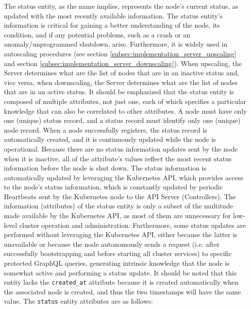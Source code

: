 The status entity, as the name implies, represents the node's current status, as
updated with the most recently available information.
\newline
The status entity's information is critical for gaining a better understanding
of the node, its condition, and if any potential problems, such as a crash or an
anomaly/unprogrammed shutdown, arise. Furthermore, it is widely used in
autoscaling procedures (see section \ref{subsec:implementation_server_upscaling}
and section \ref{subsec:implementation_server_downscaling}). When upscaling, the
Server determines what are the list of nodes that are in an inactive status and,
vice versa, when downscaling, the Server determines what are the list of nodes that
are in an active status. It should be emphasized that the status entity is
composed of multiple attributes, not just one, each of which specifies a
particular knowledge that can also be correlated to other attributes.
\newline
A node must have only one (unique) status record, and a status record must
identify only one (unique) node record. When a node successfully registers, the
status record is automatically created, and it is continuously updated while the
node is operational. Because there are no status information updates sent by the
node when it is inactive, all of the attribute's values reflect the most recent status
information before the node is shut down.
\newline
The status information is automatically updated by leveraging the Kubernetes API,
which provides access to the node's status information, which is constantly
updated by periodic Heartbeats sent by the Kubernetes node to the API Server (Controllers).
The information (attributes) of the status entity is only a subset of the multitude
made available by the Kubernetes API, as most of them are unnecessary for low-level
cluster operation and administration. Furthermore, some status updates are
performed without leveraging the Kubernetes API, either because the latter is unavailable
or because the node autonomously sends a request (i.e. after successfully bootstrapping
and before starting all cluster services) to specific protected GraphQL queries,
generating intrinsic knowledge that the node is somewhat active and performing a
status update.
\newline
It should be noted that this entity lacks the \texttt{created\_at} attribute because
it is created automatically when the associated node is created, and thus the
two timestamps will have the same value.
\newline
The \texttt{status} entity attributes are as follows:

